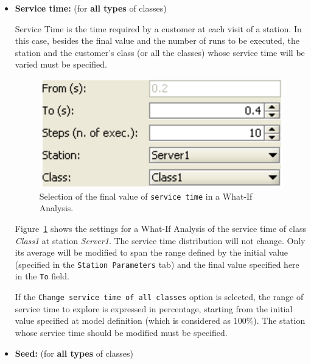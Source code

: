 \begin{itemize}
\item \textbf{Service time:} (for \textbf{all types} of classes)

Service Time is the time required by a customer at each visit of a
station. In this case, besides the final value and the number of
runs to be executed, the station and the customer's class (or all
the classes) whose service time will be varied must be specified.
\begin{figure}[hbt]
    \begin{center}
        \includegraphics[scale=.5]{img/jsimg/7.6.eps}
    \end{center}
    \caption{Selection of the final value of \texttt{service time}
    in a What-If Analysis.}
    \label{fig:selservti}
\end{figure}
Figure~\ref{fig:selservti} shows the settings for a What-If
Analysis of the service time of class \emph{Class1} at station
\emph{Server1}. The service time distribution will not change.
Only its average will be modified to span the range defined by the
initial value (specified in the \texttt{Station Parameters} tab)
and the final value specified here in the \texttt{To} field.

If the \texttt{Change service time of all classes} option is
selected, the range of service time to explore is expressed in
percentage, starting from the initial value specified at model
definition (which is considered as 100\%). The station whose
service time should be modified must be specified.

\item \textbf{Seed:} (for \textbf{all types} of classes)


\end{itemize}

